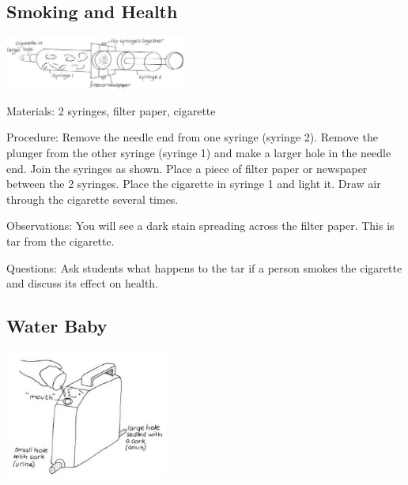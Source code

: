 \begin{multicols}{2}
\subsection{Smoking and Health}

\begin{center}
\includegraphics[width=0.45\textwidth]{./img/vso/smoking.jpg}
\end{center}

\begin{description*}
\item[Materials:]{2 syringes, filter paper, cigarette}
\item[Procedure:]{Remove the needle end from one syringe (syringe 2). Remove the
plunger from the other syringe (syringe 1) and make a larger hole in
the needle end. Join the syringes as shown. Place a piece of filter paper
or newspaper between the 2 syringes. Place the cigarette in syringe 1
and light it. Draw air through the cigarette several times.}
\item[Observations:]{You will
see a dark stain spreading across the filter paper. This is tar from the cigarette.}
\item[Questions:]{Ask students what happens to the tar if a person smokes the cigarette and discuss its effect on health.}
\end{description*}

\subsection{Water Baby} %

\begin{center}
\includegraphics[width=0.4\textwidth]{./img/vso/water-baby.jpg}
\end{center}


\end{multicols}
